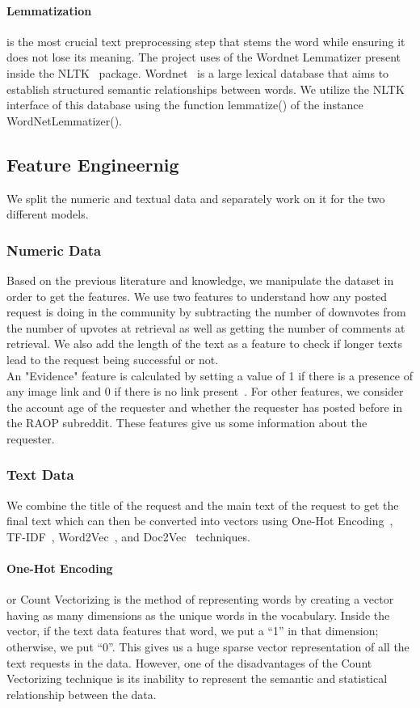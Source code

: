 \documentclass[conference]{IEEEtran}
\begin{document}
\paragraph{Lemmatization} is the most crucial text preprocessing step that stems the word while ensuring it does not lose its meaning. The project uses of the Wordnet Lemmatizer present inside the NLTK~\cite{nltk} package. Wordnet~\cite{wordnet} is a large lexical database that aims to establish structured semantic relationships between words. We utilize the NLTK~\cite{nltk} interface of this database using the function lemmatize() of the instance WordNetLemmatizer().

\subsection{Feature Engineernig}
We split the numeric and textual data and separately work on it for the two different models.
\subsubsection{Numeric Data}
Based on the previous literature and knowledge, we manipulate the dataset in order to get the features. We use two features to understand how any posted request is doing in the community by subtracting the number of downvotes from the number of upvotes at retrieval as well as getting the number of comments at retrieval. We also add the length of the text as a feature to check if longer texts lead to the request being successful or not.\\
An "Evidence" feature is calculated by setting a value of 1 if there is a presence of any image link and 0 if there is no link present~\cite{raop_base}. For other features, we consider the account age of the requester and whether the requester has posted before in the RAOP subreddit. These features give us some information about the requester.
\subsubsection{Text Data}
We combine the title of the request and the main text of the request to get the final text which can then be converted into vectors using One-Hot Encoding~\cite{one_hot}, TF-IDF~\cite{tfidf}, Word2Vec~\cite{w2v}, and Doc2Vec~\cite{d2v} techniques.
\paragraph{One-Hot Encoding} or Count Vectorizing is the method of representing words by creating a vector having as many dimensions as the unique words in the vocabulary. Inside the vector, if the text data features that word, we put a “1” in that dimension; otherwise, we put “0”. This gives us a huge sparse vector representation of all the text requests in the data. However, one of the disadvantages of the Count Vectorizing technique is its inability to represent the semantic and statistical relationship between the data.
\end{document}
